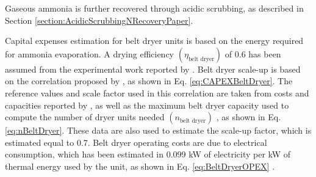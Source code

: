 \begin{refsection}[referencesCh6]
Gaseous ammonia is further recovered through acidic scrubbing, as described in Section \ref{section:AcidicScrubbingNRecoveryPaper}. 

Capital expenses estimation for belt dryer units is based on the energy required for ammonia evaporation.
A drying efficiency $\left(\eta_{\text{belt dryer}}\right)$ of 0.6 has been assumed from the experimental work reported by \citet{awiszus2018utilization}. Belt dryer scale-up is based on the correlation proposed by \citet{towler2012chemical}, as shown in Eq. \ref{eq:CAPEXBeltDryer}. The reference values and scale factor used in this correlation are taken from costs and capacities reported by \citet{turley2016assessment}, as well as the maximum belt dryer capacity used to compute the number of dryer units needed $\left(n_{\text{belt dryer}} \right)$ , as shown in Eq. \ref{eq:nBeltDryer}. These data are also used to estimate the scale-up factor, which is estimated equal to 0.7. Belt dryer operating costs are due to electrical consumption, which has been estimated in 0.099 kW of electricity per kW of thermal energy used by the unit, as shown in Eq. \ref{eq:BeltDryerOPEX} \citep{awiszus2018utilization}.


\end{refsection}

